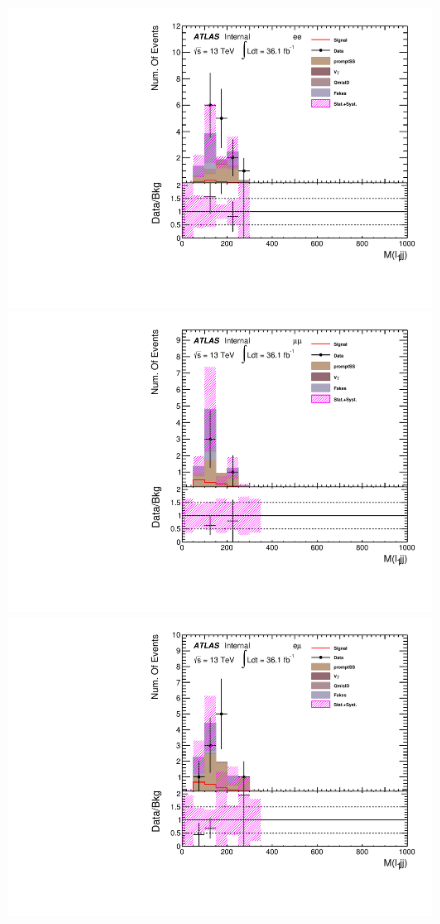 \begin{figure}[h]
\begin{minipage}[t]{0.33\linewidth}
 \centering
 \includegraphics[width=1.0\textwidth,angle=-90]{fig/SigOpt/mH500_m_l1jj_ee.pdf}
 \end{minipage}
 \begin{minipage}[t]{0.33\linewidth}
 \centering
 \includegraphics[width=1.0\textwidth,angle=-90]{fig/SigOpt/mH500_m_l1jj_mumu.pdf}
 \end{minipage}
 \begin{minipage}[t]{0.33\linewidth}
 \centering
 \includegraphics[width=1.0\textwidth,angle=-90]{fig/SigOpt/mH500_m_l1jj_emu.pdf}

\end{minipage}
\end{figure}

